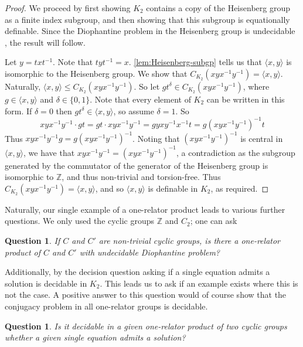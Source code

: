 \documentclass[11pt]{amsart}
\newtheorem{qu}[theorem]{Question}
\theoremstyle{definition}
\numberwithin{theorem}{section}
\newcommand{\Z}{\mathbb{Z}}
\begin{document}
\begin{proof}
  We proceed by first showing \(K_2\) contains a copy of the Heisenberg group as
  a finite index subgroup, and then showing that this subgroup is equationally
  definable. Since the Diophantine problem in the Heisenberg group is
  undecidable \cite[Theorem 4]{duchin_liang_shapiro}, the result will follow.

  Let \(y = txt^{-1}\). Note that \(tyt^{-1} = x\). \cref{lem:Heisenberg-subgp}
  tells us that \(\langle x, y \rangle\) is isomorphic to the Heisenberg group.
  We show that \(C_{K_2}(x yx^{-1}y^{-1}) = \langle x, y \rangle\). Naturally,
  \(\langle x, y \rangle \leq C_{K_2}(xyx^{-1}y^{-1})\). So let \(g t^\delta
  \in C_{K_2}(xyx^{-1}y^{-1})\), where \(g \in \langle x, y \rangle\) and
  \(\delta \in \{0, 1\}\). Note that every element of \(K_2\) can be written in
  this form. If \(\delta = 0\) then \(gt^\delta \in \langle x, y \rangle\), so
  assume \(\delta = 1\).  So
  \[
    xyx^{-1} y^{-1} \cdot gt = gt \cdot xyx^{-1}y^{-1}
    = g yxy^{-1}x^{-1}t = g (xyx^{-1}y^{-1})^{-1} t
  \]
  Thus \(xyx^{-1} y^{-1} g = g (xyx^{-1}y^{-1})^{-1}\). Noting that 
  \((xyx^{-1}y^{-1})^{-1}\) is central in \(\langle x, y \rangle\), we have 
  that \(xyx^{-1} y^{-1} =  (xyx^{-1}y^{-1})^{-1}\), a contradiction as
  the subgroup generated by the commutator of the generator of the Heisenberg
  group is isomorphic to \(\mathbb{Z}\), and thus non-trivial and torsion-free.
  Thus \(C_{K_2}(x yx^{-1}y^{-1}) = \langle x, y \rangle\), and so
  \(\langle x, y \rangle\) is definable in \(K_2\), as required.
\end{proof}

Naturally, our single example of a one-relator product leads to various further
questions. We only used the cyclic groups \(\Z\) and \(C_2\); one can ask

\begin{qu}
	If \(C\) and \(C'\) are non-trivial cyclic groups, is there a one-relator
	product of \(C\) and \(C'\) with undecidable Diophantine problem?
\end{qu}

Additionally, by \cite[Theorem 1.1]{Levine2022} the decision question asking if a
single equation admits a solution is decidable in \(K_2\). This leads us to ask
if an example exists where this is not the case. A positive answer to this question
would of course show that the conjugacy problem in all one-relator groups is decidable.

\begin{qu}
	Is it decidable in a given one-relator product of two cyclic groups whether a given
	single equation admits a solution?
\end{qu}
\end{document}
